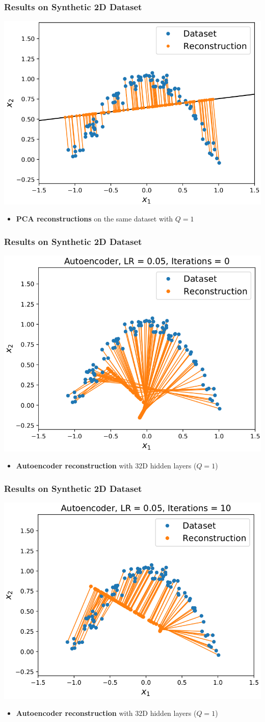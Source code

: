 \documentclass[10pt,aspectratio=169]{beamer}
\begin{document}
\begin{frame}
  \frametitle{Results on Synthetic 2D Dataset}
\begin{center}
\includegraphics[width=.5\textwidth]{images/s22}
\end{center}
\small{
\begin{itemize}
\item \textbf{PCA reconstructions} on the same dataset with $Q=1$
\end{itemize}
}
\end{frame}

\begin{frame}
  \frametitle{Results on Synthetic 2D Dataset}
\begin{center}
\includegraphics[width=.5\textwidth]{images/s23}
\end{center}
\small{
\begin{itemize}
\item \textbf{Autoencoder reconstruction} with 32D hidden layers ($Q=1$)
\end{itemize}
}
\end{frame}

\begin{frame}
  \frametitle{Results on Synthetic 2D Dataset}
\begin{center}
\includegraphics[width=.5\textwidth]{images/s24}
\end{center}
\small{
\begin{itemize}
\item \textbf{Autoencoder reconstruction} with 32D hidden layers ($Q=1$)
\end{itemize}
}
\end{frame}
\end{document}
